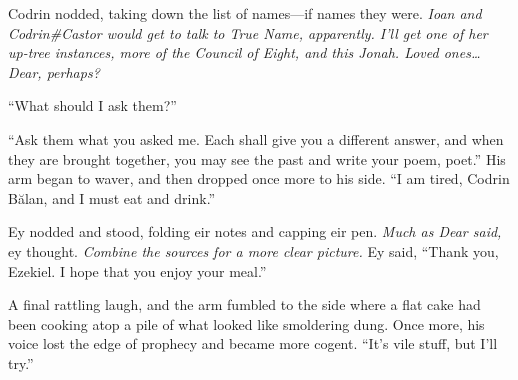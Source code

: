 Codrin nodded, taking down the list of names---if names they were. \emph{Ioan and Codrin\#Castor would get to talk to True Name, apparently. I'll get one of her up-tree instances, more of the Council of Eight, and this Jonah. Loved ones\ldots Dear, perhaps?}

``What should I ask them?''

``Ask them what you asked me. Each shall give you a different answer, and when they are brought together, you may see the past and write your poem, poet.'' His arm began to waver, and then dropped once more to his side. ``I am tired, Codrin Bălan, and I must eat and drink.''

Ey nodded and stood, folding eir notes and capping eir pen. \emph{Much as Dear said,} ey thought. \emph{Combine the sources for a more clear picture.} Ey said, ``Thank you, Ezekiel. I hope that you enjoy your meal.''

A final rattling laugh, and the arm fumbled to the side where a flat cake had been cooking atop a pile of what looked like smoldering dung. Once more, his voice lost the edge of prophecy and became more cogent. ``It's vile stuff, but I'll try.''

